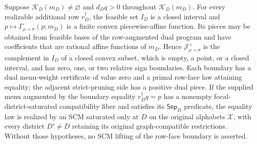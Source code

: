 Suppose \(\mathcal K_D(m_D)\ne\varnothing\) and \(d_Dq>0\) throughout \(\mathcal K_D(m_D)\). For every realizable additional row \(r_D^\dagger\), the feasible set \(I_D\) is a closed interval and \(p\mapsto\Gamma_{\rho\prec\sigma}(p;m_D)\) is a finite convex piecewise-affine function. Its pieces may be obtained from feasible bases of the row-augmented dual program and have coefficients that are rational affine functions of \(m_D\). Hence \(\mathcal J_{\rho\prec\sigma}^+\) is the complement in \(I_D\) of a closed convex subset, which is empty, a point, or a closed interval, and has zero, one, or two relative sign boundaries. Each boundary has a dual menu-weight certificate of value zero and a primal row-face law attaining equality; the adjacent strict-pruning side has a positive dual piece. If the supplied menu augmented by the boundary equality \(r_D^\dagger q=p\) has a nonempty focal-district-saturated compatibility fiber and satisfies its \(\mathsf{Sep}_D\) predicate, the equality law is realized by an SCM saturated only at \(D\) on the original alphabets \(\mathcal X\), with every district \(D'\ne D\) retaining its original graph-compatible restrictions. Without those hypotheses, no SCM lifting of the row-face boundary is asserted.